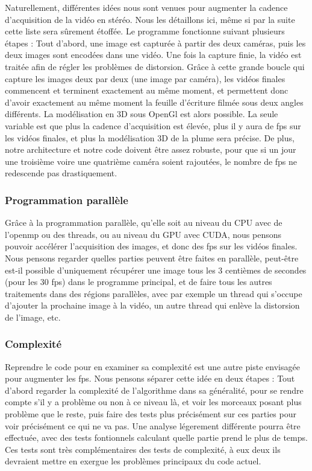Naturellement, différentes idées nous sont venues pour augmenter la cadence d'acquisition de la vidéo en stéréo. Nous les détaillons ici, même si par la suite cette liste sera sûrement étoffée. Le programme fonctionne suivant plusieurs étapes : Tout d'abord, une image est capturée à partir des deux caméras, puis les deux images sont encodées dans une vidéo. Une fois la capture finie, la vidéo est traitée afin de régler les problèmes de distorsion. Grâce à cette grande boucle qui capture les images deux par deux (une image par caméra), les vidéos finales commencent et terminent exactement au même moment, et permettent donc d'avoir exactement au même moment la feuille d'écriture filmée sous deux angles différents. La modélisation en 3D sous OpenGl est alors possible. La seule variable est que plus la cadence d'acquisition est élevée, plus il y aura de fps sur les vidéos finales, et plus la modélisation 3D de la plume sera précise. De plus, notre architecture et notre code doivent être assez robuste, pour que si un jour une troisième voire une quatrième caméra soient rajoutées, le nombre de fps ne redescende pas drastiquement.

\subsubsection{Programmation parallèle}

Grâce à la programmation parallèle, qu'elle soit au niveau du CPU avec de l'openmp ou des threads, ou au niveau du GPU avec CUDA, nous pensons pouvoir accélérer l'acquisition des images, et donc des fps sur les vidéos finales. Nous pensons regarder quelles parties peuvent être faites en parallèle, peut-être est-il possible d'uniquement récupérer une image tous les 3 centièmes de secondes (pour les 30 fps) dans le programme principal, et de faire tous les autres traitements dans des régions parallèles, avec par exemple un thread qui s'occupe d'ajouter la prochaine image à la vidéo, un autre thread qui enlève la distorsion de l'image, etc.

\subsubsection{Complexité}

Reprendre le code pour en examiner sa complexité est une autre piste envisagée pour augmenter les fps. Nous pensons séparer cette idée en deux étapes : Tout d'abord regarder la complexité de l'algorithme dans sa généralité, pour se rendre compte s'il y a problème ou non à ce niveau là, et voir les morceaux posant plus problème que le reste, puis faire des tests plus précisément sur ces parties pour voir précisément ce qui ne va pas. Une analyse légerement différente pourra être effectuée, avec des tests fontionnels calculant quelle partie prend le plus de temps. Ces tests sont très complémentaires des tests de complexité, à eux deux ils devraient mettre en exergue les problèmes principaux du code actuel.

